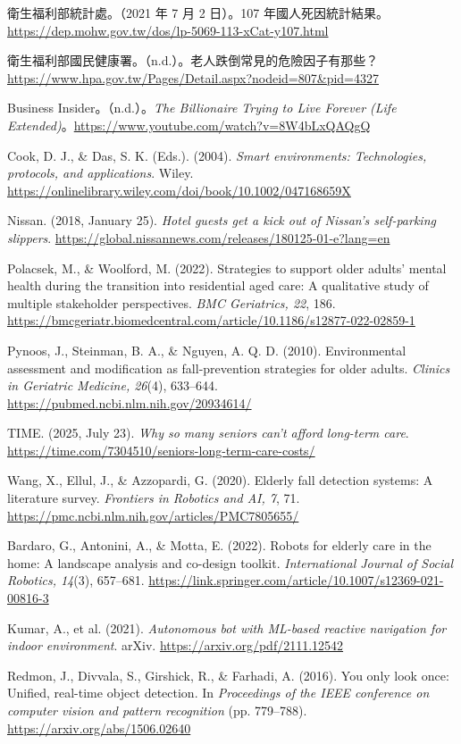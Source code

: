 \documentclass[12pt]{article}
\begin{document}
衛生福利部統計處。（2021 年 7 月 2 日）。107 年國人死因統計結果。\url{https://dep.mohw.gov.tw/dos/lp-5069-113-xCat-y107.html}

衛生福利部國民健康署。（n.d.）。老人跌倒常見的危險因子有那些？\url{https://www.hpa.gov.tw/Pages/Detail.aspx?nodeid=807&pid=4327}

Business Insider。（n.d.）。\textit{The Billionaire Trying to Live Forever (Life Extended)}。\url{https://www.youtube.com/watch?v=8W4bLxQAQgQ}

Cook, D. J., \& Das, S. K. (Eds.). (2004). \textit{Smart environments: Technologies, protocols, and applications}. Wiley. \url{https://onlinelibrary.wiley.com/doi/book/10.1002/047168659X}

Nissan. (2018, January 25). \textit{Hotel guests get a kick out of Nissan's self-parking slippers}. \url{https://global.nissannews.com/releases/180125-01-e?lang=en}

Polacsek, M., \& Woolford, M. (2022). Strategies to support older adults' mental health during the transition into residential aged care: A qualitative study of multiple stakeholder perspectives. \textit{BMC Geriatrics, 22}, 186. \url{https://bmcgeriatr.biomedcentral.com/article/10.1186/s12877-022-02859-1}

Pynoos, J., Steinman, B. A., \& Nguyen, A. Q. D. (2010). Environmental assessment and modification as fall-prevention strategies for older adults. \textit{Clinics in Geriatric Medicine, 26}(4), 633--644. \url{https://pubmed.ncbi.nlm.nih.gov/20934614/}

TIME. (2025, July 23). \textit{Why so many seniors can't afford long-term care}. \url{https://time.com/7304510/seniors-long-term-care-costs/}

Wang, X., Ellul, J., \& Azzopardi, G. (2020). Elderly fall detection systems: A literature survey. \textit{Frontiers in Robotics and AI, 7}, 71. \url{https://pmc.ncbi.nlm.nih.gov/articles/PMC7805655/}

Bardaro, G., Antonini, A., \& Motta, E. (2022). Robots for elderly care in the home: A landscape analysis and co-design toolkit. \textit{International Journal of Social Robotics, 14}(3), 657--681. \url{https://link.springer.com/article/10.1007/s12369-021-00816-3}

Kumar, A., et al. (2021). \textit{Autonomous bot with ML-based reactive navigation for indoor environment}. arXiv. \url{https://arxiv.org/pdf/2111.12542}

Redmon, J., Divvala, S., Girshick, R., \& Farhadi, A. (2016). You only look once: Unified, real-time object detection. In \textit{Proceedings of the IEEE conference on computer vision and pattern recognition} (pp. 779--788). \url{https://arxiv.org/abs/1506.02640}
\end{document}
